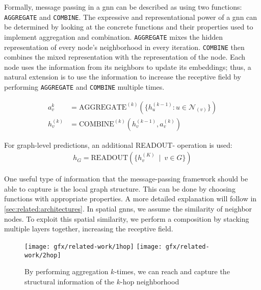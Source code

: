 Formally, message passing in a \ac{gnn} can be described as using two functions:
\texttt{AGGREGATE} and \texttt{COMBINE}.
The expressive and representational power of a \ac{gnn} can be determined by looking at the concrete functions and their properties used to implement aggregation and combination.
\texttt{AGGREGATE} mixes the hidden representation of every node's neighborhood in every iteration.
\texttt{COMBINE} then combines the mixed representation with the representation of the node.
Each node uses the information from its neighbors to update its embeddings;
thus, a natural extension is to use the information to increase the receptive field by performing \texttt{AGGREGATE} and \texttt{COMBINE} multiple times.

\begin{align*}
    a_{v}^{k}   & = \mathrm{AGGREGATE}^{(k)}(\{h_{u}^{(k-1)}: u \in \mathcal{N}_{(v)}\}) \\
    h_{v}^{(k)} & = \mathrm{COMBINE}^{(k)}(h_{v}^{(k-1)}, a_{v}^{(k)})
\end{align*}

For graph-level predictions, an additional READOUT- operation is used:
\begin{align*}
    h_{G} =\mathrm{READOUT}(\{h_{v}^{(K)}\ \mid \ v \in G\})
\end{align*}

One useful type of information that the message-passing framework should be able to capture is the local graph structure.
This can be done by choosing functions with appropriate properties.
A more detailed explanation will follow in \cref{sec:related:architectures}.
In spatial \acp{gnn}, we assume the similarity of neighbor nodes.
To exploit this spatial similarity, we perform a composition by stacking multiple layers together, increasing the receptive field.

\begin{figure}[ht]
    \centering
    \texttt{[image: gfx/related-work/1hop]}\hspace{1cm}
    \texttt{[image: gfx/related-work/2hop]}
    \caption{By performing aggregation $k$-times, we can reach and capture the
        structural information of the $k$-hop neighborhood}\label{fig:related:1hop}
\end{figure}


